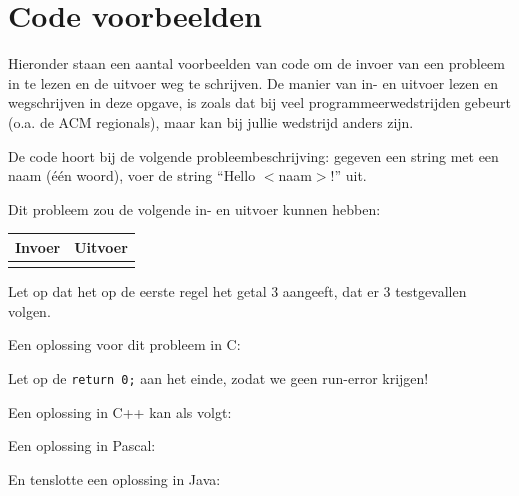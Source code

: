 \documentclass[11pt,a4paper]{article}
\begin{document}
\newpage
\appendix

\section{Code voorbeelden}\label{codeexamples}

Hieronder staan een aantal voorbeelden van code om de invoer van een
probleem in te lezen en de uitvoer weg te schrijven. De manier van
in- en uitvoer lezen en wegschrijven in deze opgave, is zoals dat bij
veel programmeerwedstrijden gebeurt (o.a. de ACM regionals), maar kan
bij jullie wedstrijd anders zijn.

De code hoort bij de volgende probleembeschrijving: gegeven een string
met een naam (\'e\'en woord), voer de string ``Hello $<$naam$>$!'' uit.

Dit probleem zou de volgende in- en uitvoer kunnen hebben:

\begin{tabular}{|p{}|p{}|}
\hline
\textbf{Invoer} & \textbf{Uitvoer} \\
\hline
 &
 \\
\hline
\end{tabular}

Let op dat het op de eerste regel het getal 3 aangeeft, dat er 3
testgevallen volgen.

Een oplossing voor dit probleem in C:

Let op de \texttt{return 0;} aan het einde, zodat we geen
run-error krijgen!

\newpage

Een oplossing in C++ kan als volgt:

Een oplossing in Pascal:

\newpage

En tenslotte een oplossing in Java:
\end{document}
